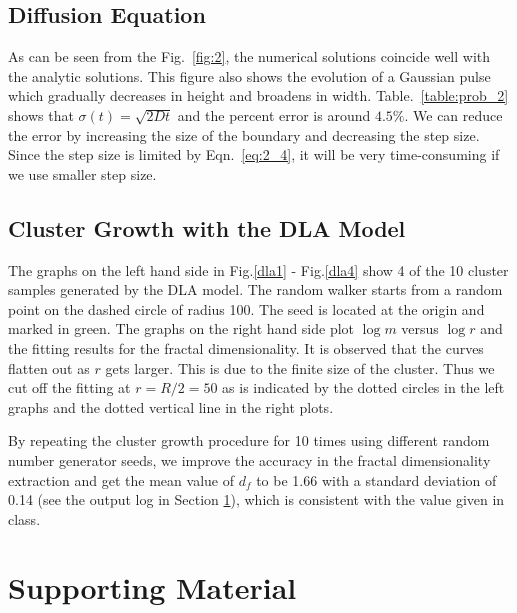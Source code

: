 \documentclass[notitlepage,aps,prd,nofootinbib]{revtex4-1}
\begin{document}
\subsection{Diffusion Equation}
As can be seen from the Fig.~\eqref{fig:2}, the numerical solutions coincide well with the analytic solutions. This figure also shows the evolution of a Gaussian pulse which gradually decreases in height and broadens in width. Table.~\eqref{table:prob_2} shows that $\sigma(t) = \sqrt{2Dt}$ and the percent error is around $4.5\%$. We can reduce the error by increasing the size of the boundary and decreasing the step size. Since the step size is limited by Eqn.~\eqref{eq:2_4}, it will be very time-consuming if we use smaller step size. 

\subsection{Cluster Growth with the DLA Model}
The graphs on the left hand side in Fig.\ref{dla1} - Fig.\ref{dla4} show 4 of the 10 cluster samples generated by the DLA model. The random walker starts from a random point on the dashed circle of radius 100. The seed is located at the origin and marked in green. The graphs on the right hand side plot $\log m$ versus $\log r$ and the fitting results for the fractal dimensionality. It is observed that the curves flatten out as $r$ gets larger. This is due to the finite size of the cluster. Thus we cut off the fitting at $r = R/2 = 50$ as is indicated by the dotted circles in the left graphs and the dotted vertical line in the right plots. 

By repeating the cluster growth procedure for 10 times using different random number generator seeds, we improve the accuracy in the fractal dimensionality extraction and get the mean value of $d_f$ to be 1.66 with a standard deviation of 0.14 (see the output log in Section \ref{sec:Supporting_Material}), which is consistent with the value given in class.



\clearpage
\section{Supporting Material}
\label{sec:Supporting_Material}

 
\end{document}

